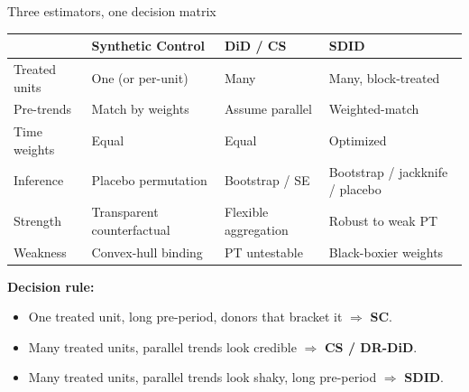 \documentclass[aspectratio=169,11pt]{beamer}
\begin{document}
\begin{frame}{Three estimators, one decision matrix}
\vspace{0.4em}
\begin{center}\footnotesize
\begin{tabular}{p{} p{} p{} p{}}
\toprule
 & \textbf{Synthetic Control} & \textbf{DiD / CS} & \textbf{SDID} \\
\midrule
Treated units & One (or per-unit) & Many & Many, block-treated \\
Pre-trends & Match by weights & Assume parallel & Weighted-match \\
Time weights & Equal & Equal & Optimized \\
Inference & Placebo permutation & Bootstrap / SE & Bootstrap / jackknife / placebo \\
Strength & Transparent counterfactual & Flexible aggregation & Robust to weak PT \\
Weakness & Convex-hull binding & PT untestable & Black-boxier weights \\
\bottomrule
\end{tabular}
\end{center}

\vspace{0.6em}
\textbf{Decision rule:}
\begin{itemize}\small
  \item One treated unit, long pre-period, donors that bracket it $\Rightarrow$ \textbf{SC}.
  \item Many treated units, parallel trends look credible $\Rightarrow$ \textbf{CS / DR-DiD}.
  \item Many treated units, parallel trends look shaky, long pre-period $\Rightarrow$ \textbf{SDID}.
\end{itemize}
\end{frame}
\end{document}
